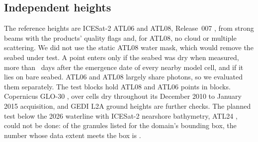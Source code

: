 \subsection{Independent heights}
\label{sec:heights}
The reference heights are ICESat-2 ATL06 and ATL08, Release~007 \citep{atl06_v7,atl08_v7,markus2017}, from strong beams with the products' quality flags and, for ATL08, no cloud or multiple scattering. We did not use the static ATL08 water mask, which would remove the seabed under test. A point enters only if the seabed was dry when measured, more than ~days after the emergence date of every nearby model cell, and if it lies on bare seabed. ATL06 and ATL08 largely share photons, so we evaluated them separately. The test blocks hold  ATL08 and  ATL06 points in  blocks. Copernicus GLO-30 \citep{copdem,copdem_handbook_i5}, over cells dry throughout its December 2010 to January 2015 acquisition, and GEDI L2A ground heights \citep{gedi_l2a_v2} are further checks. The planned test below the 2026 waterline with ICESat-2 nearshore bathymetry, ATL24 \citep{atl24_v2,is2_atl24_atbd_v2}, could not be done: of the  granules listed for the domain's bounding box, the number whose data extent meets the box is .
